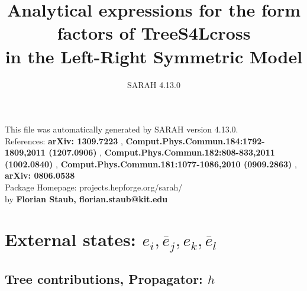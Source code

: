 \documentclass[A4,landscape]{article}
\begin{document}
\title{Analytical expressions for the form factors of TreeS4Lcross\\ in the Left-Right Symmetric Model } 
 \author{SARAH 4.13.0} 
 \maketitle 
 \vspace{10cm} 
This file was automatically generated by SARAH version 4.13.0.  \\ 
References: {\bf arXiv: 1309.7223 }, {\bf Comput.Phys.Commun.184:1792-1809,2011 (1207.0906) }, {\bf Comput.Phys.Commun.182:808-833,2011 (1002.0840) }, {\bf Comput.Phys.Commun.181:1077-1086,2010 (0909.2863) }, {\bf arXiv: 0806.0538 } \\ 
Package Homepage: projects.hepforge.org/sarah/ \\ 
by {\bf Florian Staub, florian.staub@kit.edu} 
 \pagebreak 
 \tableofcontents 
 \pagebreak 
\section{External states: ${e_{{i}}, \bar{e}_{{j}}, e_{{k}}, \bar{e}_{{l}}}$} 
\subsection{Tree contributions, Propagator: $h$} 
\end{document}
